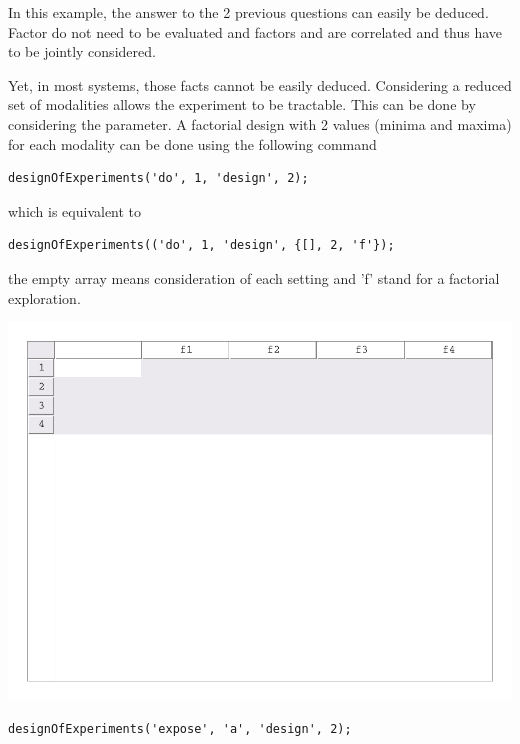 \documentclass[a4paper,fleqn]{tufte-handout}
\begin{document}


In this example, the answer  to the 2 previous questions can easily be deduced. Factor  do not need to be evaluated and factors  and  are correlated and thus have to be jointly considered.

Yet, in most systems, those facts cannot be easily deduced. Considering a reduced set of modalities allows the experiment to be tractable. This can be done by considering the  parameter. A factorial design with 2 values (minima and maxima) for each modality can be done using the following command

\begin{lstlisting}
designOfExperiments('do', 1, 'design', 2);
\end{lstlisting}

which is equivalent to
\begin{lstlisting}
designOfExperiments(('do', 1, 'design', {[], 2, 'f'});
\end{lstlisting}

the empty array means consideration of each setting and 'f' stand for a factorial exploration.

\begin{marginfigure}
\includegraphics[trim={0 7.5cm 0 0},clip,width=\textwidth]{../demo/designOfExperiments/report/figures/anova}
\end{marginfigure}

\begin{lstlisting}
designOfExperiments('expose', 'a', 'design', 2);
\end{lstlisting}
\end{document}
